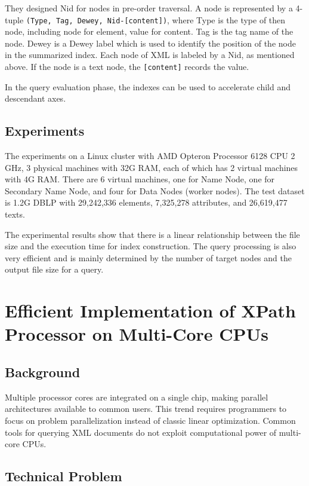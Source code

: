 \documentclass{paper}
\begin{document}
They designed Nid for nodes in pre-order traversal. A node is
represented by a 4-tuple  \verb|(Type, Tag, Dewey, Nid-[content])|, where
Type is the type of then node, including node for element, value for
content. Tag is the tag name of the node. Dewey is a Dewey label
which is used to identify the position of the  node in the summarized
index. Each node of XML is labeled by a Nid, as mentioned above.  If
the node is a text node, the \verb|[content]| records the value. 

In the query evaluation phase, the indexes can be used to accelerate 
child and descendant axes.


\subsection{Experiments} 

The experiments on a Linux cluster with AMD Opteron Processor 6128 CPU
2 GHz, 3 physical machines with 32G RAM, each of which has 2 virtual
machines with 4G RAM. There are 6 virtual machines, one for Name Node,
one for Secondary Name Node, and four for Data Nodes (worker nodes).
The test dataset is 1.2G DBLP with 29,242,336 elements, 7,325,278
attributes, and 26,619,477 texts.

The experimental results show that there is a linear relationship
between the file size and the execution time for index construction.
The query processing is also very efficient and is mainly determined
by the number of target nodes and the output file size for a query.



\section{Efficient Implementation of XPath Processor on Multi-Core CPUs}

\subsection{Background}

Multiple processor cores are integrated on a single chip, making
parallel architectures available to common users. This trend requires
programmers to focus on problem parallelization instead of classic
linear optimization. Common tools for querying XML documents do not
exploit computational power of multi-core CPUs. 



\subsection{Technical Problem}
\end{document}
